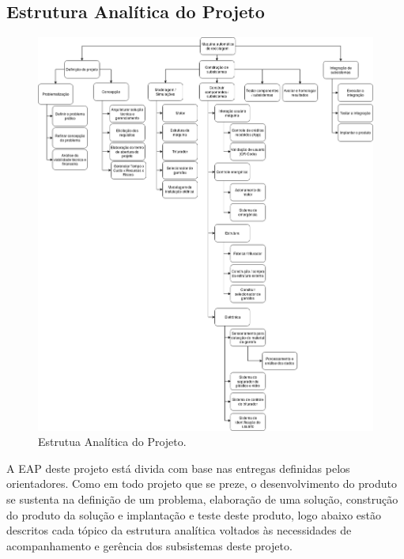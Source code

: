 \begin{apendicesenv}
\subsection{Estrutura Analítica do Projeto}

\begin{figure}[!ht]
	\centering
		\includegraphics[scale=0.4]{figuras/eap}
	\caption{Estrutua Analítica do Projeto.}
\end{figure}

A EAP deste projeto está divida com base nas entregas definidas pelos orientadores. Como em todo projeto que se preze, o desenvolvimento do produto se sustenta na definição de um problema, elaboração de uma solução, construção do produto da solução e implantação e teste deste produto, logo abaixo estão descritos cada tópico da estrutura analítica voltados às necessidades de acompanhamento e gerência dos subsistemas deste projeto.


\end{apendicesenv}
